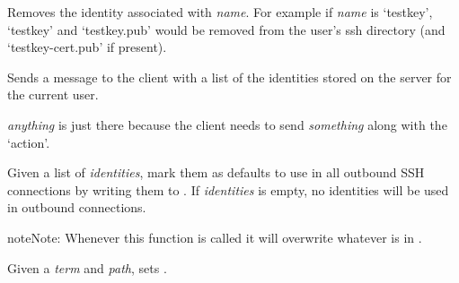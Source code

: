 \documentclass[letterpaper,10pt,openany]{sphinxmanual}
\begin{document}

\begin{fulllineitems}
\label{Applications/terminal/plugin_ssh:ssh.delete_identity}
Removes the identity associated with \emph{name}.  For example if \emph{name} is
`testkey', `testkey' and `testkey.pub' would be removed from the user's
ssh directory (and `testkey-cert.pub' if present).

\end{fulllineitems}


\begin{fulllineitems}
\label{Applications/terminal/plugin_ssh:ssh.get_identities}
Sends a message to the client with a list of the identities stored on the
server for the current user.

\emph{anything} is just there because the client needs to send \emph{something} along
with the `action'.

\end{fulllineitems}


\begin{fulllineitems}
\label{Applications/terminal/plugin_ssh:ssh.set_default_identities}
Given a list of \emph{identities}, mark them as defaults to use in all outbound
SSH connections by writing them to .  If
\emph{identities} is empty, no identities will be used in outbound connections.

\begin{notice}{note}{Note:}
Whenever this function is called it will overwrite whatever is in
.
\end{notice}

\end{fulllineitems}


\begin{fulllineitems}
\label{Applications/terminal/plugin_ssh:ssh.set_ssh_socket}
Given a \emph{term} and \emph{path}, sets
.

\end{fulllineitems}
\end{document}
